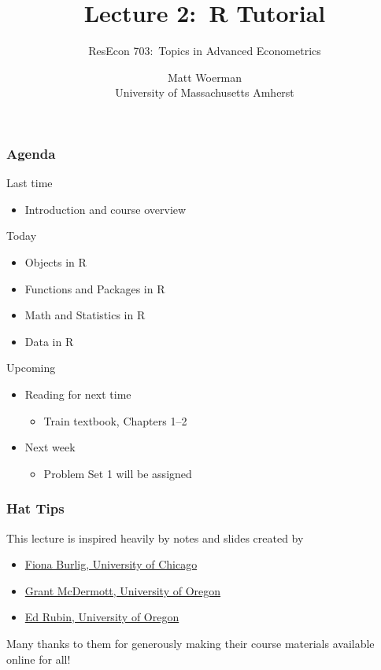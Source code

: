 \documentclass{beamer}\usepackage[]{graphicx}\usepackage[]{color}
\title[Lecture 2:\ R Tutorial]{Lecture 2:\ R Tutorial}
\author[ResEcon 703:\ Advanced Econometrics]{ResEcon 703:\ Topics in Advanced Econometrics}
\date{Matt Woerman\\University of Massachusetts Amherst}
\begin{document}
{ 
\begin{frame}[noframenumbering]
    \titlepage
\end{frame}
}

\begin{frame}\frametitle{Agenda}
    Last time
    \begin{itemize}
        \item Introduction and course overview
    \end{itemize}
    \vspace{2ex}
    Today
    \begin{itemize}
        \item Objects in R
        \item Functions and Packages in R
        \item Math and Statistics in R
        \item Data in R
    \end{itemize}
    \vspace{2ex}
    Upcoming
    \begin{itemize}
        \item Reading for next time
        \begin{itemize}
            \item Train textbook, Chapters 1--2
        \end{itemize}
        \item Next week
        \begin{itemize}
            \item Problem Set 1 will be assigned
        \end{itemize}
    \end{itemize}
\end{frame}

\begin{frame}\frametitle{Hat Tips}
    This lecture is inspired heavily by notes and slides created by
    \begin{itemize}
        \item \href{https://www.fionaburlig.com/}{Fiona Burlig, University of Chicago}
        \item \href{https://grantmcdermott.com/}{Grant McDermott, University of Oregon}
        \item \href{http://edrub.in/}{Ed Rubin, University of Oregon}
    \end{itemize}
    \vspace{3ex}
    Many thanks to them for generously making their course materials available online for all!
\end{frame}
\end{document}
